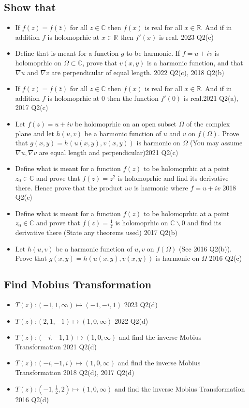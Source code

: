 \documentclass[a4paper, 8pt]{extarticle}
\begin{document}
\subsection{Show that}
\begin{itemize}
	\item If $\overline{f(z)} = f(\overline{z})$ for all $z \in \mathbb{C}$ then $f(x)$ is real for all $x \in \mathbb{R}$. And if in addition $f$ is holomoprhic at $x \in \mathbb{R}$ then $f'(x)$ is real. \hfill 2023 Q2(c)
	\item Define that is meant for a function $g$ to be harmonic. If $f = u +iv$ is holomoprhic on $\Omega \subset \mathbb{C}$, prove that $v(x,y)$ is a harmonic function, and that $\nabla u$ and $\nabla v$ are perpendicular of equal length. \hfill 2022 Q2(c), 2018 Q2(b)
	\item If $\overline{f(z)} = f(\overline{z})$ for all $z \in \mathbb{C}$ then $f(x)$ is real for all $x \in \mathbb{R}$. And if in addition $f$ is holomoprhic at $0$ then the function $f'(0)$ is real.\hfill 2021 Q2(a), 2017 Q2(c)
	\item Let $f(z) = u +iv$ be holomoprhic on an open subset $\Omega$ of the complex plane and let $h(u,v)$ be a harmonic function of $u$ and $v$ on $f(\Omega)$. Prove that $g(x,y) = h(u(x,y), v(x,y))$ is harmonic on $\Omega$ (You may assume $\nabla u, \nabla v$ are equal length and perpendicular)\hfill 2021 Q2(c)
	\item Define what is meant for a function $f(z)$ to be holomoprhic at a point $z_0 \in \mathbb{C}$ and prove that $f(z) = z^2$ is holomoprhic and find its derivative there. Hence prove that the product $uv$ is harmonic where $f=u +iv$ \hfill 2018 Q2(c)
	\item Define what is meant for a function $f(z)$ to be holomoprhic at a point $z_0 \in \mathbb{C}$ and prove that $f(z) = \frac{1}{z}$ is holomoprhic on $\mathbb{C} \backslash 0$ and find its derivative there (State any theorems used) \hfill 2017 Q2(b)
	\item Let $h(u,v)$ be a harmonic function of $u, v$ on $f(\Omega)$ (See 2016 Q2(b)). Prove that $g(x,y) = h(u(x,y), v(x,y))$ is harmonic on $\Omega$ \hfill 2016 Q2(c)
\end{itemize}
\subsection{Find Mobius Transformation}
\begin{itemize}
	\item $T(z) : (-1, 1, \infty) \mapsto (-1, -i, 1)$ \hfill 2023 Q2(d)
	\item $T(z) : (2, 1, -1) \mapsto (1, 0, \infty)$    \hfill 2022 Q2(d)
	\item $T(z) : (-i, -1, 1) \mapsto (1, 0, \infty)$ and find the inverse Mobius Transformation \hfill 2021 Q2(d)
	\item $T(z) : (-i, -1, i) \mapsto (1, 0, \infty)$ and find the inverse Mobius Transformation \hfill 2018 Q2(d), 2017 Q2(d)
	\item $T(z) : (-1, \frac{1}{2}, 2) \mapsto (1, 0, \infty)$ and find the inverse Mobius Transformation \hfill 2016 Q2(d)
\end{itemize}
\end{document}
